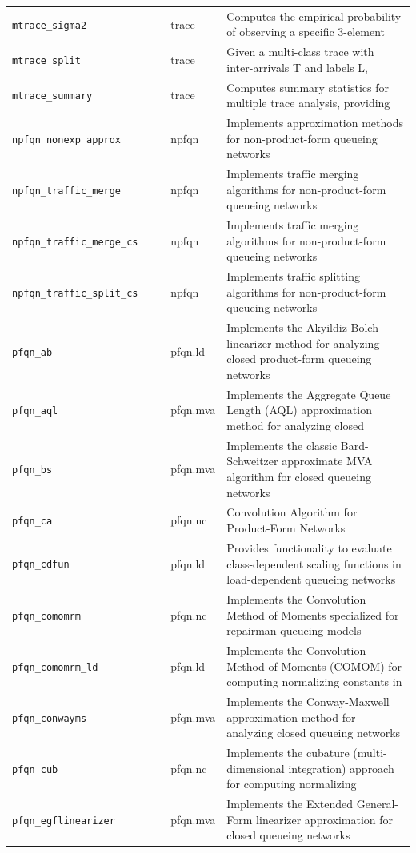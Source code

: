 \begin{footnotesize}
\begin{longtable}{|p{0.4\linewidth}|p{0.1\linewidth}|p{0.5\linewidth}|}
\texttt{mtrace\_sigma2} & trace & Computes the empirical probability of observing a specific 3-element\\
\texttt{mtrace\_split} & trace & Given a multi-class trace with inter-arrivals T and labels L,\\
\texttt{mtrace\_summary} & trace & Computes summary statistics for multiple trace analysis, providing\\
\texttt{npfqn\_nonexp\_approx} & npfqn & Implements approximation methods for non-product-form queueing networks\\
\texttt{npfqn\_traffic\_merge} & npfqn & Implements traffic merging algorithms for non-product-form queueing networks\\
\texttt{npfqn\_traffic\_merge\_cs} & npfqn & Implements traffic merging algorithms for non-product-form queueing networks\\
\texttt{npfqn\_traffic\_split\_cs} & npfqn & Implements traffic splitting algorithms for non-product-form queueing networks\\
\texttt{pfqn\_ab} & pfqn.ld & Implements the Akyildiz-Bolch linearizer method for analyzing closed product-form queueing networks\\
\texttt{pfqn\_aql} & pfqn.mva & Implements the Aggregate Queue Length (AQL) approximation method for analyzing closed\\
\texttt{pfqn\_bs} & pfqn.mva & Implements the classic Bard-Schweitzer approximate MVA algorithm for closed queueing networks\\
\texttt{pfqn\_ca} & pfqn.nc & Convolution Algorithm for Product-Form Networks\\
\texttt{pfqn\_cdfun} & pfqn.ld & Provides functionality to evaluate class-dependent scaling functions in load-dependent queueing networks\\
\texttt{pfqn\_comomrm} & pfqn.nc & Implements the Convolution Method of Moments specialized for repairman queueing models\\
\texttt{pfqn\_comomrm\_ld} & pfqn.ld & Implements the Convolution Method of Moments (COMOM) for computing normalizing constants in\\
\texttt{pfqn\_conwayms} & pfqn.mva & Implements the Conway-Maxwell approximation method for analyzing closed queueing networks\\
\texttt{pfqn\_cub} & pfqn.nc & Implements the cubature (multi-dimensional integration) approach for computing normalizing\\
\texttt{pfqn\_egflinearizer} & pfqn.mva & Implements the Extended General-Form linearizer approximation for closed queueing networks\\

\end{longtable}
\end{footnotesize}
